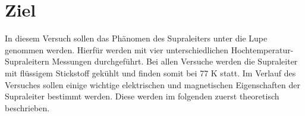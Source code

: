 \section{Ziel}
\label{sec:Ziel}
In diesem Versuch sollen das Ph\"{a}nomen des Supraleiters unter die Lupe genommen werden.
Hierf\"ur werden mit vier unterschiedlichen Hochtemperatur-Supraleitern Messungen durchgef\"uhrt.
Bei allen Versuche werden die Supraleiter mit fl\"ussigem Stickstoff gek\"uhlt und finden somit bei 77 K statt.
Im Verlauf des Versuches sollen einige wichtige elektrischen und magnetischen Eigenschaften der Supraleiter bestimmt werden.
Diese werden im folgenden zuerst theoretisch beschrieben.
